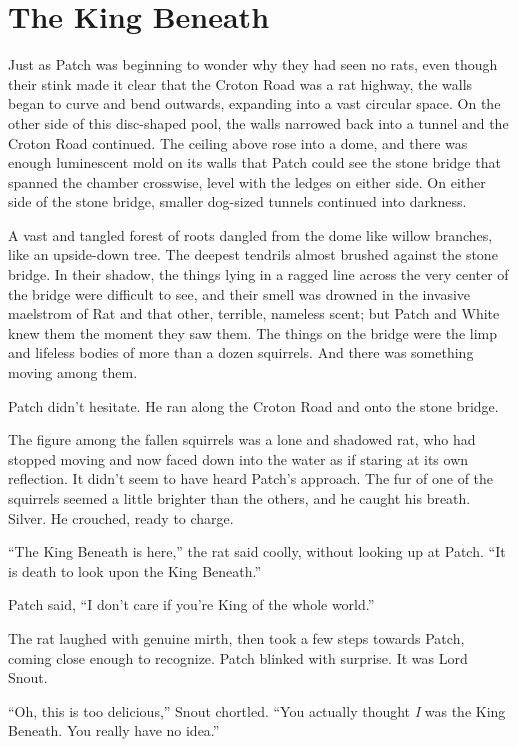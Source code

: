 \documentclass[12pt]{memoir}
\begin{document}

\section{The King Beneath}

Just as Patch was beginning to wonder why they had seen no rats, even
though their stink made it clear that the Croton Road was a rat
highway, the walls began to curve and bend outwards, expanding into a
vast circular space. On the other side of this disc-shaped pool, the
walls narrowed back into a tunnel and the Croton Road continued. The
ceiling above rose into a dome, and there was enough luminescent mold
on its walls that Patch could see the stone bridge that spanned the
chamber crosswise, level with the ledges on either side. On either
side of the stone bridge, smaller dog-sized tunnels continued into
darkness.

A vast and tangled forest of roots dangled from the dome like willow
branches, like an upside-down tree. The deepest tendrils almost
brushed against the stone bridge. In their shadow, the things lying in
a ragged line across the very center of the bridge were difficult to
see, and their smell was drowned in the invasive maelstrom of Rat and
that other, terrible, nameless scent; but Patch and White knew them
the moment they saw them. The things on the bridge were the limp and
lifeless bodies of more than a dozen squirrels. And there was
something moving among them.

Patch didn’t hesitate. He ran along the Croton Road and onto the stone
bridge.

The figure among the fallen squirrels was a lone and shadowed rat, who
had stopped moving and now faced down into the water as if staring at
its own reflection. It didn’t seem to have heard Patch’s approach. The
fur of one of the squirrels seemed a little brighter than the others,
and he caught his breath. Silver. He crouched, ready to charge.

“The King Beneath is here,” the rat said coolly, without looking up at
Patch. “It is death to look upon the King Beneath.”

Patch said, “I don’t care if you’re King of the whole world.”

The rat laughed with genuine mirth, then took a few steps towards
Patch, coming close enough to recognize. Patch blinked with
surprise. It was Lord Snout.

“Oh, this is too delicious,” Snout chortled. “You actually thought
\textit{I} was the King Beneath. You really have no idea.”
\end{document}
